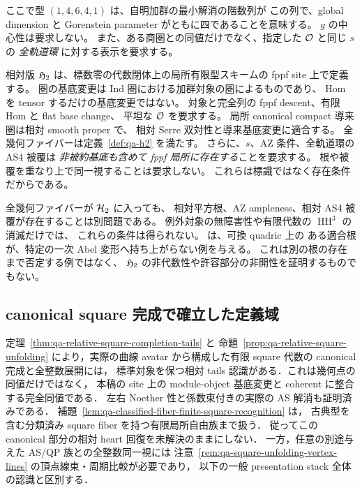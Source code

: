 ここで型 \((1,4,6,4,1)\) は、自明加群の最小解消の階数列が
この列で、global dimension と Gorenstein parameter がともに四であることを意味する。
\(g\) の中心性は要求しない。
また、ある商圏との同値だけでなく、指定した \(\mathcal O\) と同じ \(s\) の
\emph{全軌道環} に対する表示を要求する。

相対版 \(\mathfrak H_2\) は、標数零の代数閉体上の局所有限型スキームの
fppf site 上で定義する。
圏の基底変更は Ind 圏における加群対象の圏によるものであり、
Hom を tensor するだけの基底変更ではない。
対象と完全列の fppf descent、有限 Hom と flat base change、
平坦な \(\mathcal O\) を要求する。
局所 canonical compact 導来圏は相対 smooth proper で、
相対 Serre 双対性と導来基底変更に適合する。
全幾何ファイバーは定義~\ref{def:qa-h2} を満たす。
さらに、\(s\)、AZ 条件、全軌道環の AS4 被覆は
\emph{非被約基底も含めて fppf 局所に存在する}ことを要求する。
根や被覆を重なり上で同一視することは要求しない。
これらは標識ではなく存在条件だからである。

\begin{remark}[相対存在は幾何点条件より強い]
\label{rem:qa-relative-root}
全幾何ファイバーが \(\mathcal H_2\) に入っても、
相対平方根、AZ ampleness、相対 AS4 被覆が存在することは別問題である。
例外対象の無障害性や有限代数の \(\operatorname{HH}^3\) の消滅だけでは、
これらの条件は得られない。
\cite[\texttt{prop:chosen-root-does-not-lift}]{QuadricModuli2026} は、可換 quadric 上の
ある適合根が、特定の一次 Abel 変形へ持ち上がらない例を与える。
これは別の根の存在まで否定する例ではなく、
\(\mathfrak H_2\) の非代数性や許容部分の非開性を証明するものでもない。
\end{remark}

\subsection{canonical square 完成で確立した定義域}

定理~\ref{thm:qa-relative-square-completion-tails} と
命題~\ref{prop:qa-relative-square-unfolding} により，実際の曲線 avatar
から構成した有限 square 代数の canonical 完成と全整数展開には，
標準対象を保つ相対 tails 認識がある．これは幾何点の同値だけではなく，
本稿の site 上の module-object 基底変更と coherent に整合する完全同値である．
左右 Noether 性と係数束付きの実際の AS 解消も証明済みである．
補題~\ref{lem:qa-classified-fiber-finite-square-recognition} は，
古典型を含む分類済み square fiber を持つ有限局所自由族まで扱う．
従ってこの canonical 部分の相対 heart 回復を未解決のままにしない．
一方，任意の別途与えた AS/QP 族との全整数同一視には
注意~\ref{rem:qa-square-unfolding-vertex-lines} の頂点線束・周期比較が必要であり，
以下の一般 presentation stack 全体の認識と区別する．

